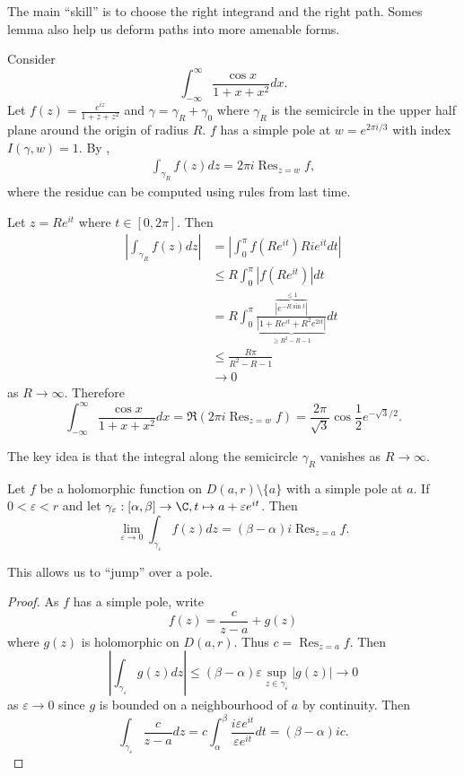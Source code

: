 \documentclass[a4paper]{article}
\DeclareMathOperator*{\res}{Res}
\begin{document}
The main ``skill'' is to choose the right integrand and the right path. Somes lemma also help us deform paths into more amenable forms.

\begin{eg}
  Consider
  \[
    \int_{-\infty}^\infty \frac{\cos x}{1 + x + x^2} dx.
  \]
  Let \(f(z) = \frac{e^{iz}}{1 + z + z^2}\) and \(\gamma = \gamma_R + \gamma_0\) where \(\gamma_R\) is the semicircle in the upper half plane around the origin of radius \(R\). \(f\) has a simple pole at \(w = e^{2\pi i/3}\) with index \(I(\gamma, w) = 1\). By ,
  \begin{align*}
    \int_{\gamma_R} f(z) dz = 2\pi i \res_{z = w} f,
  \end{align*}
  where the residue can be computed using rules from last time.

  Let \(z = Re^{it}\) where \(t \in [0, 2\pi]\). Then
  \begin{align*}
    \left| \int_{\gamma_R} f(z) dz \right|
    &= \left| \int_0^\pi f(Re^{it})Rie^{it} dt \right| \\
    &\leq R \int_0^\pi |f(Re^{it})| dt \\
    &= R \int_0^\pi \frac{\overbrace{|e^{-R\sin t}|}^{\leq 1}}{\underbrace{|1 + Re^{it} + R^2e^{2it}|}_{\geq R^2 - R - 1}} dt \\
    &\leq \frac{R\pi}{R^2 - R - 1} \\
    &\to 0
  \end{align*}
  as \(R \to \infty\). Therefore
  \[
    \int_{-\infty}^\infty \frac{\cos x}{1 + x + x^2} dx = \Re (2\pi i \res_{z = w} f) = \frac{2\pi}{\sqrt 3} \cos \frac{1}{2} e^{-\sqrt 3/2}.
  \]
\end{eg}

The key idea is that the integral along the semicircle \(\gamma_R\) vanishes as \(R \to \infty\).

\begin{lemma}
  Let \(f\) be a holomorphic function on \(D(a, r) \setminus \{a\}\) with a simple pole at \(a\). If \(0 < \varepsilon < r\) and let \(\gamma_\varepsilon: [\alpha, \beta] \to \C, t \mapsto a + \varepsilon e^{it}\). Then
  \[
    \lim_{\varepsilon \to 0} \int_{\gamma_\varepsilon} f(z) dz = (\beta - \alpha) i \res_{z = a} f.
  \]
\end{lemma}

This allows us to ``jump'' over a pole.

\begin{proof}
  As \(f\) has a simple pole, write
  \[
    f(z) = \frac{c}{z - a} + g(z)
  \]
  where \(g(z)\) is holomorphic on \(D(a, r)\). Thus \(c = \res_{z = a} f\). Then
  \[
    \left| \int_{\gamma_\varepsilon} g(z) dz \right| \leq (\beta - \alpha) \varepsilon \sup_{z \in \gamma_\varepsilon} |g(z)| \to 0
  \]
  as \(\varepsilon \to 0\) since \(g\) is bounded on a neighbourhood of \(a\) by continuity. Then
  \[
    \int_{\gamma_\varepsilon} \frac{c}{z - a} dz = c \int_\alpha^\beta \frac{i\varepsilon e^{it}}{\varepsilon e^{it}} dt = (\beta - \alpha)ic.
  \]
\end{proof}
\end{document}
